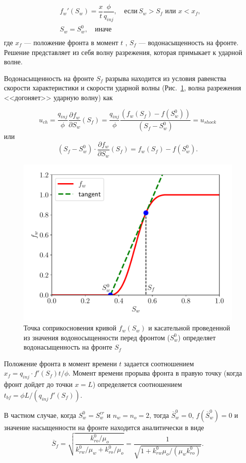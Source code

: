 \begin{equation}\label{exactSol_test}
	\begin{split}
		& f_w'(S_w) = \dfrac{x}{t} \dfrac{\phi}{q_{inj}}, \quad \text{если}\, S_w > S_f \text{ или } x < x_f, \\
		 & S_w=S_w^0, \quad \text{иначе} \\
	\end{split}
	\end{equation}
	где $x_f$ --- положение фронта в момент $t$ , $S_f$ --- водонасыщенность на фронте.
Решение представляет из себя волну разрежения, которая примыкает к ударной волне.

Водонасыщенность на фронте $S_f$ разрыва находится из условия равенства скорости характеристики и скорости ударной волны (Рис.~\ref{fig:FwCurveTangent}, волна разрежения <<догоняет>> ударную волну) как

\begin{equation}\label{eq:u_shock_ch}
	u_{ch} = \dfrac{q_{inj}}{\phi} \frac{\partial f_w}{\partial S_w}(S_f) = \dfrac{q_{inj}}{\phi} \dfrac{(f_w(S_f)-f(S_w^0))}{(S_f-S_w^0)} = u_{shock}
\end{equation}
или
\begin{equation}\label{eq:S_front_eq}
	(S_f-S_w^0)\cdot \frac{\partial f_w}{\partial S_w}(S_f)=f_w(S_f)-f(S_w^0).
\end{equation}
\begin{figure}[H]
	\centering
	\includegraphics[width=0.7\linewidth]{img/FwCurveTangent}
	\caption{Точка соприкосновения кривой $f_w(S_w)$ и касательной проведенной из значения водоносыщенности перед фронтом ($S_w^0$) определяет водонасыщенность на фронте $S_f$}
	\label{fig:FwCurveTangent}
\end{figure}

Положение фронта в момент времени $t$ задается соотношением $x_f=q_{inj}\cdot f'(S_f)t /\phi$. Момент времени прорыва фронта в правую точку (когда фронт дойдет до точки $x=L$) определяется соотношением
$  t_{bf}=\phi L / (q_{inj} \,f'(S_f)).$


В частном случае, когда $S_w^0=S_w^{cr}$ и $n_w=n_o=2$, тогда $\overline{S}_w^0=0$, $f(\overline{S}_w^0)=0$ и
значение насыщенности на фронте находится аналитически в виде
\begin{equation}\label{eq:star:exact_sw}
  \overline{S}_f=\sqrt{\frac{k_{ro}^0/\mu_o}{k_{rw}^0/\mu_w+k_{ro}^0/\mu_o}}=\frac{1}{\sqrt{1+k_{rw}^0 \mu_o/ (\mu_w k_{ro}^0)}}.
\end{equation}




